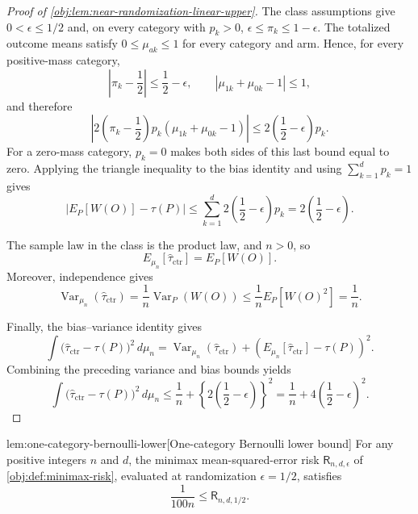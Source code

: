 \documentclass[11pt]{article}
\begin{document}
\begin{proof}[Proof of \cref{obj:lem:near-randomization-linear-upper}]
The class assumptions give \(0<\epsilon\le1/2\) and, on every category with \(p_k>0\),
\(\epsilon\le\pi_k\le1-\epsilon\). The totalized outcome means satisfy \(0\le\mu_{ak}\le1\) for every category and arm. Hence, for every positive-mass category,
\[
\left|\pi_k-\frac12\right|\le\frac12-\epsilon,
\qquad
|\mu_{1k}+\mu_{0k}-1|\le1,
\]
and therefore
\[
\left|2\left(\pi_k-\frac12\right)p_k(\mu_{1k}+\mu_{0k}-1)\right|
\le
2\left(\frac12-\epsilon\right)p_k .
\]
For a zero-mass category, \(p_k=0\) makes both sides of this last bound equal to zero. Applying the triangle inequality to the bias identity and using \(\sum_{k=1}^d p_k=1\) gives
\[
\left|E_P[W(O)]-\tau(P)\right|
\le
\sum_{k=1}^d 2\left(\frac12-\epsilon\right)p_k
=
2\left(\frac12-\epsilon\right).
\]

The sample law in the class is the product law, and \(n>0\), so
\[
E_{\mu_n}[\widehat\tau_{\mathrm{ctr}}]=E_P[W(O)].
\]
Moreover, independence gives
\[
\operatorname{Var}_{\mu_n}(\widehat\tau_{\mathrm{ctr}})
=
\frac1n\operatorname{Var}_P(W(O))
\le
\frac1n E_P[W(O)^2]
=
\frac1n .
\]

Finally, the bias--variance identity gives
\[
\int
\bigl(\widehat\tau_{\mathrm{ctr}}-\tau(P)\bigr)^2\,d\mu_n
=
\operatorname{Var}_{\mu_n}(\widehat\tau_{\mathrm{ctr}})
+
\left(E_{\mu_n}[\widehat\tau_{\mathrm{ctr}}]-\tau(P)\right)^2 .
\]
Combining the preceding variance and bias bounds yields
\[
\int
\bigl(\widehat\tau_{\mathrm{ctr}}-\tau(P)\bigr)^2\,d\mu_n
\le
\frac1n+
\left\{2\left(\frac12-\epsilon\right)\right\}^2
=
\frac1n+4\left(\frac12-\epsilon\right)^2 .
\]
\end{proof}

\begin{lemmav}{lem:one-category-bernoulli-lower}[One-category Bernoulli lower bound]
For any positive integers \(n\) and \(d\), the minimax mean-squared-error risk \(\mathsf R_{n,d,\epsilon}\) of \cref{obj:def:minimax-risk}, evaluated at randomization \(\epsilon=1/2\), satisfies
\[
\frac{1}{100n}\le \mathsf R_{n,d,1/2}.
\]
\end{lemmav}
\end{document}
